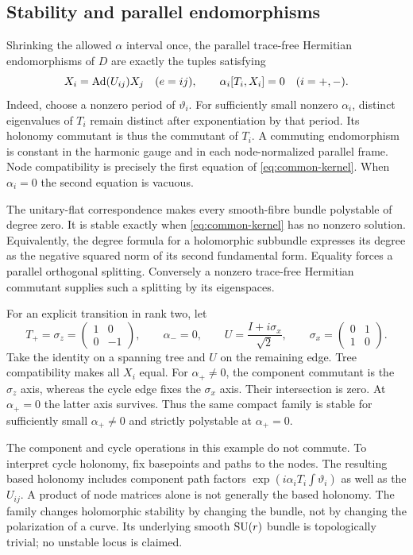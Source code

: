 \subsection{Stability and parallel endomorphisms}
Shrinking the allowed $\alpha$ interval once, the parallel trace-free
Hermitian endomorphisms of $D$ are exactly the tuples satisfying
\begin{equation}\label{eq:common-kernel}
 X_i=\operatorname{Ad}(U_{ij})X_j\quad(e=ij),\qquad
 \alpha_i[T_i,X_i]=0\quad(i=+,-).
\end{equation}
Indeed, choose a nonzero period of $\vartheta_i$. For sufficiently small
nonzero $\alpha_i$, distinct eigenvalues of $T_i$ remain distinct
after exponentiation by that period. Its holonomy commutant is thus the
commutant of $T_i$. A commuting endomorphism is constant in the harmonic
gauge and in each node-normalized parallel frame. Node compatibility is
precisely the first equation of \eqref{eq:common-kernel}. When
$\alpha_i=0$ the second equation is vacuous.

The unitary-flat correspondence \cite{narasimhan-seshadri} makes every
smooth-fibre bundle polystable of degree zero. It is stable exactly when
\eqref{eq:common-kernel} has no nonzero solution. Equivalently, the
degree formula for a holomorphic subbundle expresses its degree as the
negative squared norm of its second fundamental form. Equality forces a
parallel orthogonal splitting. Conversely a nonzero trace-free Hermitian
commutant supplies such a splitting by its eigenspaces.

For an explicit transition in rank two, let
\begin{equation}\label{eq:pauli-data}
 T_+=\sigma_z=\begin{pmatrix}1&0\\0&-1\end{pmatrix},\qquad
 \alpha_-=0,\qquad
 U=\frac{I+i\sigma_x}{\sqrt2},\qquad
 \sigma_x=\begin{pmatrix}0&1\\1&0\end{pmatrix}.
\end{equation}
Take the identity on a spanning tree and $U$ on the remaining edge.
Tree compatibility makes all $X_i$ equal. For $\alpha_+\ne0$, the
component commutant is the $\sigma_z$ axis, whereas the cycle edge
fixes the $\sigma_x$ axis. Their intersection is zero. At
$\alpha_+=0$ the latter axis survives. Thus the same compact family is
stable for sufficiently small $\alpha_+\ne0$ and strictly polystable
at $\alpha_+=0$.

The component and cycle operations in this example do not commute.
To interpret cycle holonomy, fix basepoints and paths to the nodes.
The resulting based holonomy includes component path factors
$\exp(i\alpha_iT_i\int\vartheta_i)$ as well as the $U_{ij}$.
A product of node matrices alone is not generally the based holonomy.
The family changes holomorphic stability by changing the bundle, not
by changing the polarization of a curve. Its underlying smooth
$\operatorname{SU}(r)$ bundle is topologically trivial; no unstable locus is
claimed.
